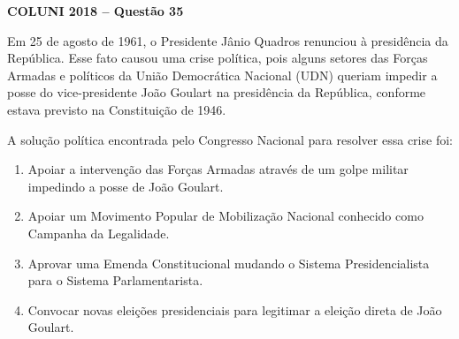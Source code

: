 \textbf{COLUNI 2018 -- Questão 35}\par\medskip Em 25 de agosto de 1961, o Presidente Jânio Quadros renunciou à presidência da República. Esse fato causou uma crise política, pois alguns setores das Forças Armadas e políticos da União Democrática Nacional (UDN) queriam impedir a posse do vice-presidente João Goulart na presidência da República, conforme estava previsto na Constituição de 1946.

\par

A solução política encontrada pelo Congresso Nacional para resolver essa crise foi:\begin{enumerate}
\item Apoiar a intervenção das Forças Armadas através de um golpe militar impedindo a posse de João Goulart.
\item Apoiar um Movimento Popular de Mobilização Nacional conhecido como Campanha da Legalidade.
\item Aprovar uma Emenda Constitucional mudando o Sistema Presidencialista para o Sistema Parlamentarista.
\item Convocar novas eleições presidenciais para legitimar a eleição direta de João Goulart.\end{enumerate}
